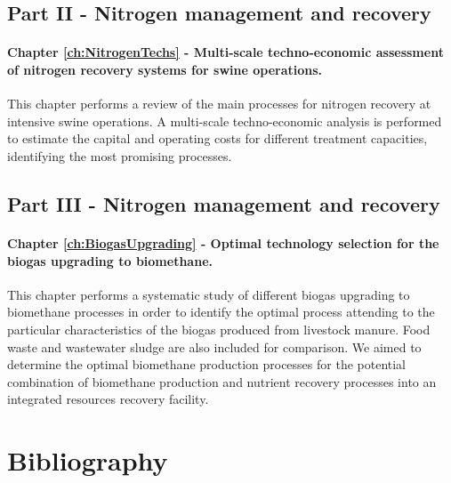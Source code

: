 \begin{refsection}[referencesCh1]
\subsection{Part II - Nitrogen management and recovery}
\paragraph{Chapter \ref{ch:NitrogenTechs} - Multi-scale techno-economic assessment of nitrogen recovery systems for swine operations.} This chapter performs a review of the main processes for nitrogen recovery at intensive swine operations. A multi-scale techno-economic analysis is performed to estimate the capital and operating costs for different treatment capacities, identifying the most promising processes.

\subsection{Part III - Nitrogen management and recovery}
\paragraph{Chapter \ref{ch:BiogasUpgrading} - Optimal technology selection for the biogas upgrading to biomethane.} This chapter performs a systematic study of different biogas upgrading to biomethane processes in order to identify the optimal process attending to the particular characteristics of the biogas produced from livestock manure. Food waste and wastewater sludge are also included for comparison. We aimed to determine the optimal biomethane production processes for the potential combination of biomethane production and nutrient recovery processes into an integrated resources recovery facility.

\section*{Bibliography}

\printbibliography[heading=none]
\end{refsection}